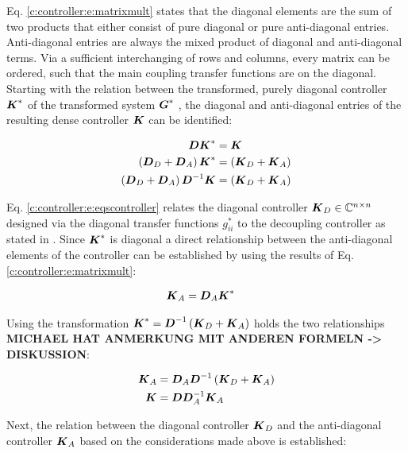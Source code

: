 Eq. \ref{c:controller:e:matrixmult} states that the diagonal elements are the sum of two products that either consist of pure diagonal or pure anti-diagonal entries. Anti-diagonal entries are always the mixed product of diagonal and anti-diagonal terms. Via a sufficient interchanging of rows and columns, every matrix can be ordered, such that the main coupling transfer functions are on the diagonal.\\

Starting with the relation between the transformed, purely diagonal controller $\mbox{\boldmath$K$}^*$ of the transformed system $\mbox{\boldmath$G$}^*$ , the  diagonal and anti-diagonal entries of the resulting dense controller $\mbox{\boldmath$K$}$ can be identified:

\begin{align}
\begin{split}
\mbox{\boldmath$D$}\mbox{\boldmath$K$}^* &= \mbox{\boldmath$K$} \\
\left(\mbox{\boldmath$D$}_D + \mbox{\boldmath$D$}_A \right) \mbox{\boldmath$K$}^* &= \left(\mbox{\boldmath$K$}_D + \mbox{\boldmath$K$}_A \right)\\
\left(\mbox{\boldmath$D$}_D + \mbox{\boldmath$D$}_A \right) \mbox{\boldmath$D$}^{-1} \mbox{\boldmath$K$} &= \left(\mbox{\boldmath$K$}_D + \mbox{\boldmath$K$}_A \right)
\end{split}
\label{c:controller:e:eqscontroller}
\end{align}

Eq. \ref{c:controller:e:eqscontroller} relates the diagonal controller $\mbox{\boldmath$K$}_D \in \mathbb{C}^{n \times n}$ designed via the diagonal transfer functions $g^*_{ii}$ to the decoupling controller as stated in \cite{Astrom2001a} . Since $\mbox{\boldmath$K$}^{*}$ is diagonal a direct relationship between the anti-diagonal elements of the controller can be established by using the results of Eq.\ref{c:controller:e:matrixmult}:

\begin{align*}
\begin{split}
\mbox{\boldmath$K$}_A &= \mbox{\boldmath$D$}_A \mbox{\boldmath$K$}^* 
\end{split}
\end{align*}

Using the transformation $\mbox{\boldmath$K$}^* = \mbox{\boldmath$D$}^{-1} \left( \mbox{\boldmath$K$}_D + \mbox{\boldmath$K$}_A \right)$ holds the two relationships \textbf{MICHAEL HAT ANMERKUNG MIT ANDEREN FORMELN -> DISKUSSION}:

\begin{align*}
\mbox{\boldmath$K$}_A &= \mbox{\boldmath$D$}_A \mbox{\boldmath$D$}^{-1} \left( \mbox{\boldmath$K$}_D + \mbox{\boldmath$K$}_A \right) \\
\mbox{\boldmath$K$} &= \mbox{\boldmath$D$}\mbox{\boldmath$D$}_A^{-1} \mbox{\boldmath$K$}_A
\end{align*}

Next, the relation between the diagonal controller $\mbox{\boldmath$K$}_D$ and the anti-diagonal controller $\mbox{\boldmath$K$}_A$ based on the considerations made above is established:

